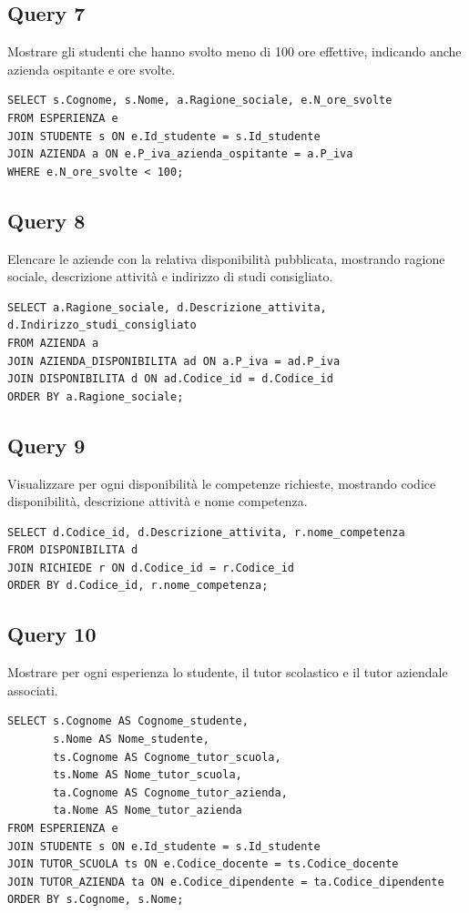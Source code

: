 \documentclass[a4paper,12pt]{article}
\begin{document}
\subsection*{Query 7}Mostrare gli studenti che hanno svolto meno di 100 ore effettive, indicando anche azienda ospitante e ore svolte.
\begin{lstlisting}
SELECT s.Cognome, s.Nome, a.Ragione_sociale, e.N_ore_svolte
FROM ESPERIENZA e
JOIN STUDENTE s ON e.Id_studente = s.Id_studente
JOIN AZIENDA a ON e.P_iva_azienda_ospitante = a.P_iva
WHERE e.N_ore_svolte < 100;
\end{lstlisting}
\subsection*{Query 8}Elencare le aziende con la relativa disponibilità pubblicata, mostrando ragione sociale, descrizione attività e indirizzo di studi consigliato.
\begin{lstlisting}
SELECT a.Ragione_sociale, d.Descrizione_attivita, d.Indirizzo_studi_consigliato
FROM AZIENDA a
JOIN AZIENDA_DISPONIBILITA ad ON a.P_iva = ad.P_iva
JOIN DISPONIBILITA d ON ad.Codice_id = d.Codice_id
ORDER BY a.Ragione_sociale;
\end{lstlisting}
\subsection*{Query 9}Visualizzare per ogni disponibilità le competenze richieste, mostrando codice disponibilità, descrizione attività e nome competenza.
\begin{lstlisting}
SELECT d.Codice_id, d.Descrizione_attivita, r.nome_competenza
FROM DISPONIBILITA d
JOIN RICHIEDE r ON d.Codice_id = r.Codice_id
ORDER BY d.Codice_id, r.nome_competenza;
\end{lstlisting}
\subsection*{Query 10}Mostrare per ogni esperienza lo studente, il tutor scolastico e il tutor aziendale associati.
\begin{lstlisting}
SELECT s.Cognome AS Cognome_studente,
       s.Nome AS Nome_studente,
       ts.Cognome AS Cognome_tutor_scuola,
       ts.Nome AS Nome_tutor_scuola,
       ta.Cognome AS Cognome_tutor_azienda,
       ta.Nome AS Nome_tutor_azienda
FROM ESPERIENZA e
JOIN STUDENTE s ON e.Id_studente = s.Id_studente
JOIN TUTOR_SCUOLA ts ON e.Codice_docente = ts.Codice_docente
JOIN TUTOR_AZIENDA ta ON e.Codice_dipendente = ta.Codice_dipendente
ORDER BY s.Cognome, s.Nome;
\end{lstlisting}
\end{document}
